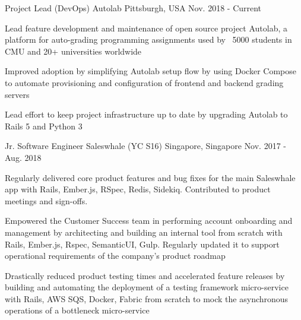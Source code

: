 \begin{cventries}
  \cventry
  {Project Lead (DevOps)} %
    {Autolab} %
    {Pittsburgh, USA} %
    {Nov. 2018 - Current} %
    {
      \begin{cvitems} %
        \item {Lead feature development and maintenance of open source project Autolab, a platform for auto-grading programming assignments used by ~5000 students in CMU and 20+ universities worldwide}
        \item {Improved adoption by simplifying Autolab setup flow by using Docker Compose to automate provisioning and configuration of frontend and backend grading servers}
        \item {Lead effort to keep project infrastructure up to date by upgrading Autolab to Rails 5 and Python 3}
      \end{cvitems}
    }

  \cventry
    {Jr. Software Engineer} %
    {Saleswhale (YC S16)} %
    {Singapore, Singapore} %
    {Nov. 2017 - Aug. 2018} %
    {
      \begin{cvitems} %
      \item { Regularly delivered core product features and bug fixes for the main Saleswhale app with Rails, Ember.js, RSpec, Redis, Sidekiq. Contributed to product meetings and sign-offs.}
      \item { Empowered the Customer Success team in performing account onboarding and management by architecting and building an internal tool from scratch with Rails, Ember.js, Rspec, SemanticUI, Gulp. Regularly updated it to support operational requirements of the company's product roadmap}
      \item { Drastically reduced product testing times and accelerated feature releases by building and automating the deployment of a testing framework micro-service with Rails, AWS SQS, Docker, Fabric from scratch to mock the asynchronous operations of a bottleneck micro-service}
      \end{cvitems}
    }


\end{cventries}
